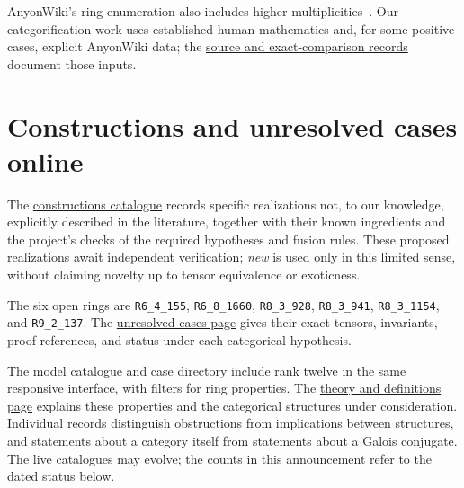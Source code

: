 \documentclass[11pt,a4paper]{article}
\newcommand{\classcommit}{d920cc2531d8b03583c797886a3c2ab6170a281a}
\newcommand{\classrepo}{https://github.com/sebastienpalcoux/grothendieck-ring-classification}
\newcommand{\atlas}{https://sebastienpalcoux.github.io/grothendieck-ring-classification}
\newcommand{\prooflink}[2]{\href{\classrepo/blob/\classcommit/#1}{#2}}
\newcommand{\constructionsurl}{https://sebastienpalcoux.github.io/grothendieck-ring-classification/constructions.html}
\begin{document}
AnyonWiki's ring enumeration also includes higher
multiplicities~\cite{AW,VS23}. Our categorification work uses established
human mathematics and, for some positive cases, explicit AnyonWiki data;
the \prooflink{evidence/anyonwiki/README.md}{source and exact-comparison records}
document those inputs.

\section{Constructions and unresolved cases online}
The \href{\constructionsurl}{constructions catalogue} records specific
realizations not, to our knowledge, explicitly described in the literature,
together with their known ingredients and the project's checks of the
required hypotheses and fusion rules. These proposed realizations await
independent verification; \emph{new} is used only in this limited sense,
without claiming novelty up to tensor equivalence or exoticness.

The six open rings are \texttt{R6\_4\_155}, \texttt{R6\_8\_1660},
\texttt{R8\_3\_928}, \texttt{R8\_3\_941}, \texttt{R8\_3\_1154}, and
\texttt{R9\_2\_137}. The
\href{\atlas/unresolved.html}{unresolved-cases page} gives their exact
tensors, invariants, proof references, and status under each categorical
hypothesis.

The \href{\atlas/\#rings}{model catalogue} and
\href{\atlas/records.html}{case directory} include rank twelve in the
same responsive interface, with filters for ring properties. The
\href{\atlas/theory.html}{theory and definitions page} explains these
properties and the categorical structures under consideration.
Individual records distinguish obstructions from implications between
structures, and statements about a category itself from statements about
a Galois conjugate. The live catalogues may evolve; the counts in this
announcement refer to the dated status below.

\end{document}
